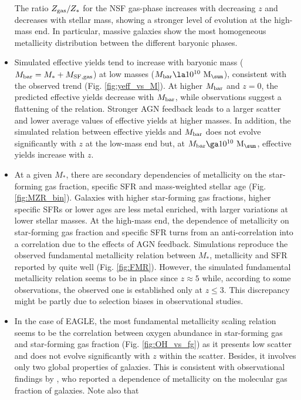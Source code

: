 \documentclass[useAMS,usenatbib]{mn2e}
\begin{document}
\begin{itemize}
The ratio $Z_{\rm gas}/Z_*$ for the NSF gas-phase increases with decreasing $z$
and decreases with stellar mass, showing a stronger level of evolution at the high-mass
end. In particular, massive galaxies show the most homogeneous metallicity distribution
between the different baryonic phases.  
\item Simulated effective yields tend to increase with baryonic mass 
($M_{\rm bar} = M_* + M_{\rm SF,gas}$) at low masses ($M_{\rm bar} \la 10^{10} \ {\rm M}_{\sun}$),
consistent with the observed trend (Fig. \ref{fig:yeff_vs_M}). At higher $M_{\rm bar}$ and $z=0$, the predicted
effective yields decrease with $M_{\rm bar}$, while observations suggest a flattening of the relation. 
Stronger AGN feedback leads to a larger scatter and lower
average values of effective yields at higher masses.
In addition, the simulated relation between effective yields and $M_{\rm bar}$ does not evolve significantly with
$z$ at the low-mass end but, at $M_{\rm bar} \ga 10^{10} \ {\rm M}_{\sun}$, effective yields increase with $z$. 
\item At a given $M_*$, there are secondary dependencies of metallicity on the star-forming gas fraction,
specific SFR and mass-weighted stellar age (Fig. \ref{fig:MZR_bin}). Galaxies with higher star-forming gas fractions, higher
specific SFRs or lower ages are less metal enriched, with larger variations at lower stellar masses.
At the high-mass end, the dependence of metallicity on star-forming gas fraction and
specific SFR turns from an anti-correlation into
a correlation due to the effects of AGN feedback.
Simulations reproduce the observed fundamental metallicity relation between $M_*$, metallicity
and SFR reported by \citet{mannucci2010} quite well (Fig. \ref{fig:FMR}).
However, the simulated fundamental metallicity relation seems to be in place since $z\approx5$ while, according to some
observations, the observed one is established only at $z \le 3$. 
This discrepancy might be partly due to selection biases in observational studies.
\item In the case of {\sc EAGLE}, the most fundamental metallicity scaling relation
seems to be the correlation between oxygen abundance in star-forming gas and star-forming gas fraction (Fig. \ref{fig:OH_vs_fg})
as it presents low scatter and does not evolve significantly with $z$ within the scatter.  Besides, it involves only
two global properties of galaxies.  This is consistent with observational findings by \citet{bothwell2015}, who
reported a dependence of metallicity on the molecular gas fraction of galaxies. Note also that 

\end{itemize}
\end{document}
